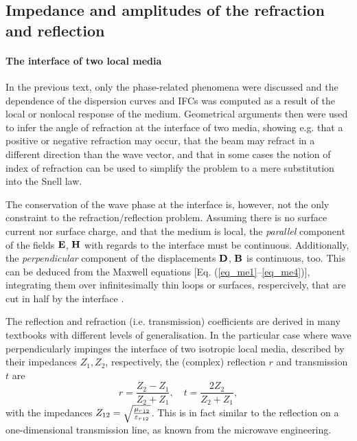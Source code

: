 
\subsection{Impedance and amplitudes of the refraction and reflection}
\paragraph{The interface of two local media} %
In the previous text, only the phase-related phenomena were discussed and the dependence of the dispersion curves and IFCs was computed as a result of the local or nonlocal response of the medium. Geometrical arguments then were used to infer the angle of refraction at the interface of two media, showing e.g. that a positive or negative refraction may occur, that the beam may refract in a different direction than the wave vector, and that in some cases the notion of index of refraction can be used to simplify the problem to a mere substitution into the Snell law.

The conservation of the wave phase at the interface is, however, not the only constraint to the refraction/reflection problem. Assuming there is no surface current nor surface charge, and that the medium is local, the \textit{parallel} component of the fields $\mathbf{E}$, $\mathbf{H}$ with regards to the interface must be continuous. Additionally, the \textit{perpendicular} component of the displacements $\mathbf{D}$, $\mathbf{B}$ is continuous, too. This can be deduced from the Maxwell equations [Eq.  (\ref{eq_me1}--\ref{eq_me4})], integrating them over infinitesimally thin loops or surfaces, respercively, that are cut in half by the interface \cite[pp. 26-29]{klingshirn2007semiconductor}. 

The reflection and refraction (i.e. transmission) coefficients are derived in many textbooks  with different levels of generalisation.  
In the particular case where wave perpendicularly impinges the interface of two isotropic local media, described by their impedances $Z_1, Z_2$, respectively, the (complex) reflection $r$ and transmission $t$ are
\begin{equation} r = \frac{Z_2 - Z_1}{Z_2+Z_1}, \quad t = \frac{2 Z_2}{Z_2 + Z_1}, \label{eq_reflection}\end{equation}
with the impedances
$Z_{12} = \sqrt{\frac{{\mu_r}_{12}}{{\varepsilon_r}_{12}  }  }$.
This is in fact similar to the reflection on a one-dimensional transmission line, as known from the microwave engineering.

